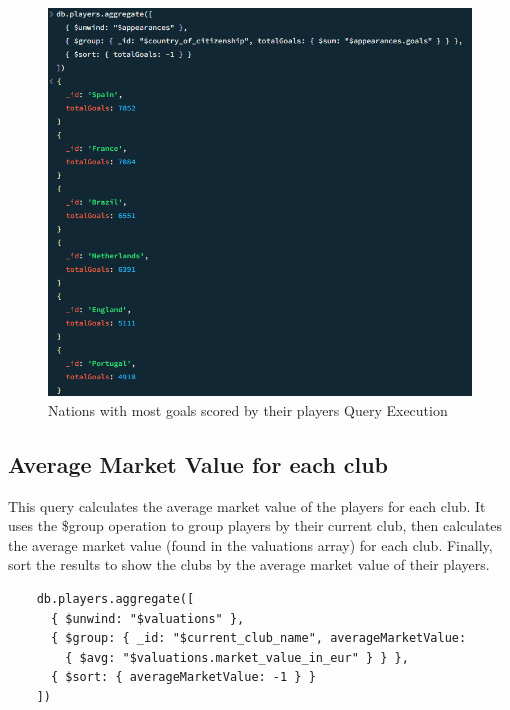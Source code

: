 \documentclass{Configuration_Files/PoliMi3i_thesis}
\begin{document}
\begin{figure}[htbp]
    \centering
    \includegraphics[scale=0.8]{Images/Queries/Nation_goals/ng.png}
    \caption{Nations with most goals scored by their players Query Execution}
\end{figure}

\subsection{Average Market Value for each club}

This query calculates the average market value of the players for each club. It uses the \$group operation to group players by their current club, then calculates the average market value (found in the valuations array) for each club. Finally, sort the results to show the clubs by the average market value of their players.

\begin{verbatim}
    db.players.aggregate([
      { $unwind: "$valuations" },
      { $group: { _id: "$current_club_name", averageMarketValue: 
        { $avg: "$valuations.market_value_in_eur" } } },
      { $sort: { averageMarketValue: -1 } }
    ])

\end{verbatim}
\end{document}
